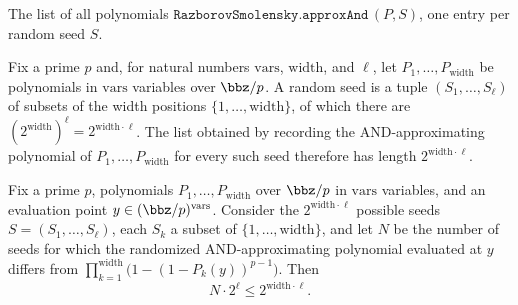 \begin{definition}
\label{RazborovSmolensky.approxAndPolyList}
\leanok
{}
The list of all polynomials $\texttt{RazborovSmolensky.approxAnd}\,(P,S)$, one entry per random seed $S$.
\end{definition}

\begin{lemma}
\label{RazborovSmolensky.approxAndPolyList_length}
\leanok
{}
Fix a prime $p$ and, for natural numbers $\mathrm{vars}$, $\mathrm{width}$, and $\ell$,
let $P_1,\dots,P_{\mathrm{width}}$ be polynomials in $\mathrm{vars}$ variables over
$\bbz/p$. A random seed is a tuple $(S_1,\dots,S_\ell)$ of subsets of the width
positions $\{1,\dots,\mathrm{width}\}$, of which there are $(2^{\mathrm{width}})^{\ell}
= 2^{\mathrm{width}\cdot\ell}$. The list obtained by recording the AND-approximating
polynomial of $P_1,\dots,P_{\mathrm{width}}$ for every such seed therefore has length
$2^{\mathrm{width}\cdot\ell}$.
\end{lemma}

\begin{theorem}
\label{RazborovSmolensky.approxAnd_pointwise_bad_count}
\leanok
{}
Fix a prime $p$, polynomials $P_1,\dots,P_{\mathrm{width}}$ over $\bbz/p$ in
$\mathrm{vars}$ variables, and an evaluation point $y \in (\bbz/p)^{\mathrm{vars}}$.
Consider the $2^{\mathrm{width}\cdot\ell}$ possible seeds $S = (S_1,\dots,S_\ell)$, each
$S_k$ a subset of $\{1,\dots,\mathrm{width}\}$, and let $N$ be the number of seeds for
which the randomized AND-approximating polynomial evaluated at $y$ differs from
$\prod_{k=1}^{\mathrm{width}}\bigl(1-(1-P_k(y))^{p-1}\bigr)$. Then
\[
N \cdot 2^{\ell} \le 2^{\mathrm{width}\cdot\ell}.
\]
\end{theorem}

